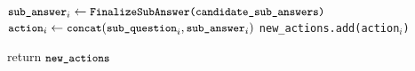 \begin{algorithm*}[tb]
\begin{small}
\begin{algorithmic}
        \STATE \(\texttt{\small sub\_answer}_i \leftarrow \texttt{\small FinalizeSubAnswer(candidate\_sub\_answers)}\) 
        \STATE \(\texttt{\small action}_i \leftarrow \texttt{\small concat}(\texttt{\small sub\_question}_i, \texttt{\small sub\_answer}_i)\) 
        \STATE \texttt{\small new\_actions.add(action$_i$)} 
    \ENDFOR
    
    \STATE return \(\texttt{\small new\_actions}\)
\end{algorithmic}
\end{small}
\end{algorithm*}
